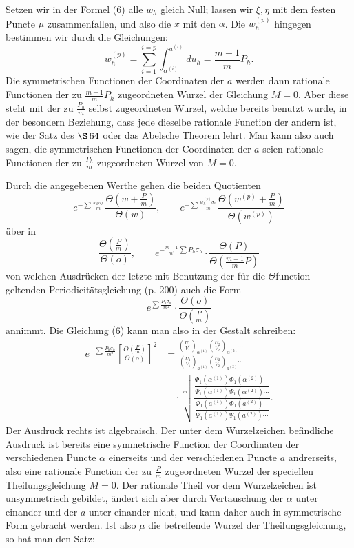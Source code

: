 \documentclass[10pt]{article}
\begin{document}
Setzen wir in der Formel (6) alle \(w_h\) gleich Null; lassen wir \(\xi,\eta\) mit dem festen Puncte \(\mu\) zusammenfallen, und also die \(x\) mit den \(\alpha\). Die \(w_h^{(p)}\) hingegen bestimmen wir durch die Gleichungen:
\[
w_h^{(p)}=\sum_{i=1}^{i=p}\int_{\alpha^{(i)}}^{a^{(i)}}du_h
=\frac{m-1}{m}P_h.
\]
Die symmetrischen Functionen der Coordinaten der \(a\) werden dann rationale Functionen der zu \(\frac{m-1}{m}P_h\) zugeordneten Wurzel der Gleichung \(M=0\). Aber diese steht mit der zu \(\frac{P_h}{m}\) selbst zugeordneten Wurzel, welche bereits benutzt wurde, in der besondern Beziehung, dass jede dieselbe rationale Function der andern ist, wie der Satz des \(\S\,64\) oder das Abelsche Theorem lehrt. Man kann also auch sagen, die symmetrischen Functionen der Coordinaten der \(a\) seien rationale Functionen der zu \(\frac{P_h}{m}\) zugeordneten Wurzel von \(M=0\).

Durch die angegebenen Werthe gehen die beiden Quotienten
\[
e^{-\sum\frac{w_h\sigma_h}{m}}
\frac{\Theta\left(w+\frac Pm\right)}{\Theta(w)},\qquad
e^{-\sum\frac{w_h^{(p)}\sigma_h}{m}}
\frac{\Theta\left(w^{(p)}+\frac Pm\right)}{\Theta(w^{(p)})}
\]
über in
\[
\frac{\Theta\left(\frac Pm\right)}{\Theta(o)},\qquad
e^{-\frac{m-1}{m^2}\sum P_h\sigma_h}\cdot
\frac{\Theta(P)}{\Theta\left(\frac{m-1}{m}P\right)}
\]
von welchen Ausdrücken der letzte mit Benutzung der für die \(\Theta\)function geltenden Periodicitätsgleichung (p. 200) auch die Form
\[
e^{\sum\frac{P_h\sigma_h}{m^2}}\cdot
\frac{\Theta(o)}{\Theta\left(\frac Pm\right)}
\]
annimmt. Die Gleichung (6) kann man also in der Gestalt schreiben:
\[
\begin{aligned}
e^{-\sum\frac{P_h\sigma_h}{m^2}}
\left[\frac{\Theta\left(\frac Pm\right)}{\Theta(o)}\right]^2
&=
\frac{\left(\frac{U_1}{V_1}\right)_{\alpha^{(1)}}
      \left(\frac{U_2}{V_2}\right)_{\alpha^{(2)}}\cdots}
     {\left(\frac{U_1}{V_1}\right)_{a^{(1)}}
      \left(\frac{U_2}{V_2}\right)_{a^{(2)}}\cdots} \\
&\quad{}\cdot
\sqrt[m]{\frac{
\dfrac{\Phi_1(\alpha^{(1)})\Phi_1(\alpha^{(2)})\cdots}
      {\Psi_1(\alpha^{(1)})\Psi_1(\alpha^{(2)})\cdots}
}{
\dfrac{\Phi_1(a^{(1)})\Phi_1(a^{(2)})\cdots}
      {\Psi_1(a^{(1)})\Psi_1(a^{(2)})\cdots}
}}.
\end{aligned}
\]
Der Ausdruck rechts ist algebraisch. Der unter dem Wurzelzeichen befindliche Ausdruck ist bereits eine symmetrische Function der Coordinaten der verschiedenen Puncte \(\alpha\) einerseits und der verschiedenen Puncte \(a\) andrerseits, also eine rationale Function der zu \(\frac Pm\) zugeordneten Wurzel der speciellen Theilungsgleichung \(M=0\). Der rationale Theil vor dem Wurzelzeichen ist unsymmetrisch gebildet, ändert sich aber durch Vertauschung der \(\alpha\) unter einander und der \(a\) unter einander nicht, und kann daher auch in symmetrische Form gebracht werden. Ist also \(\mu\) die betreffende Wurzel der Theilungsgleichung, so hat man den Satz:
\end{document}
